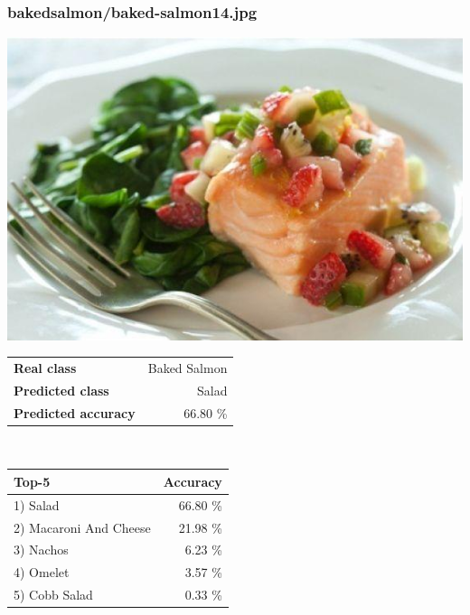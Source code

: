 \subsubsection{baked\textunderscore salmon/baked-salmon14.jpg}

\begin{minipage}[t]{0.4\textwidth}
	\vspace{0pt}
	\includegraphics[width=\linewidth]{images/evaluation-images/baked_salmon/baked-salmon14.jpg}
\end{minipage}
\hfill
\begin{minipage}[t]{0.5\textwidth}
	\vspace{0pt}\raggedright
	\begin{tabularx}{\textwidth}{X r}
		\small \textbf{Real class} & \small Baked Salmon\\
		\small \textbf{Predicted class} & \small Salad\\
		\small \textbf{Predicted accuracy} & \small 66.80 \%
    \end{tabularx}\\
    
    \vspace{6pt}
	\begin{tabularx}{\textwidth}{X r}
        \small \textbf{Top-5} & \small \textbf{Accuracy} \\
        \hline
		\small 1) Salad & \small 66.80 \%\\\small 2) Macaroni And Cheese & \small 21.98 \%\\\small 3) Nachos & \small 6.23 \%\\\small 4) Omelet & \small 3.57 \%\\\small 5) Cobb Salad & \small 0.33 \%
    \end{tabularx}
\end{minipage}
    
